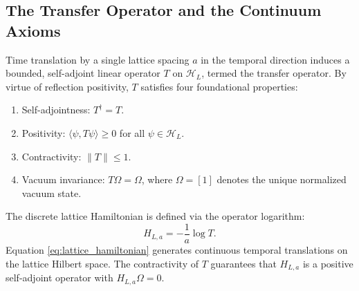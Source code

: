 \documentclass[11pt,reqno]{amsart}
\theoremstyle{plain}
\theoremstyle{definition}
\theoremstyle{remark}
\numberwithin{equation}{section}
\begin{document}
\subsection{The Transfer Operator and the Continuum Axioms}
Time translation by a single lattice spacing $a$ in the temporal direction induces a bounded, self-adjoint linear operator $T$ on $\mathcal{H}_L$, termed the transfer operator. By virtue of reflection positivity, $T$ satisfies four foundational properties:
\begin{enumerate}
\item Self-adjointness: $T^\dagger = T$.
\item Positivity: $\langle \psi, T \psi \rangle \ge 0$ for all $\psi \in \mathcal{H}_L$.
\item Contractivity: $\|T\| \le 1$.
\item Vacuum invariance: $T \Omega = \Omega$, where $\Omega = [1]$ denotes the unique normalized vacuum state.
\end{enumerate}

The discrete lattice Hamiltonian is defined via the operator logarithm:
\begin{equation}
\label{eq:lattice_hamiltonian}
H_{L,a} = - \frac{1}{a} \log T.
\end{equation}
Equation \eqref{eq:lattice_hamiltonian} generates continuous temporal translations on the lattice Hilbert space. The contractivity of $T$ guarantees that $H_{L,a}$ is a positive self-adjoint operator with $H_{L,a} \Omega = 0$.
\end{document}
